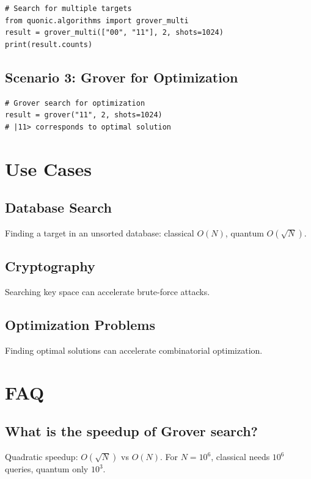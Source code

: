 \documentclass[12pt,a4paper]{article}
\begin{document}
\begin{verbatim}
# Search for multiple targets
from quonic.algorithms import grover_multi
result = grover_multi(["00", "11"], 2, shots=1024)
print(result.counts)
\end{verbatim}

\subsection{Scenario 3: Grover for Optimization}

\begin{verbatim}
# Grover search for optimization
result = grover("11", 2, shots=1024)
# |11> corresponds to optimal solution
\end{verbatim}

\section{Use Cases}

\subsection{Database Search}

Finding a target in an unsorted database: classical $O(N)$, quantum $O(\sqrt{N})$.

\subsection{Cryptography}

Searching key space can accelerate brute-force attacks.

\subsection{Optimization Problems}

Finding optimal solutions can accelerate combinatorial optimization.

\section{FAQ}

\subsection{What is the speedup of Grover search?}

Quadratic speedup: $O(\sqrt{N})$ vs $O(N)$. For $N=10^6$, classical needs $10^6$ queries, quantum only $10^3$.
\end{document}
